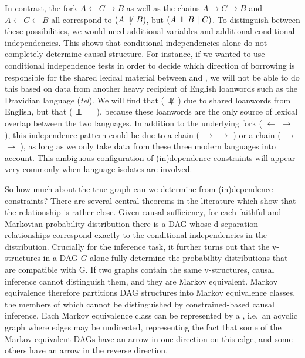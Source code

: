 In contrast, the fork $A \leftarrow C \rightarrow B$ as well as the chains $A \rightarrow C \rightarrow B$ and $A \leftarrow C \leftarrow B$ all correspond to  $(A \notindep B)$, but $(A \independent B\ |\ C)$. To distinguish between these possibilities, we would need additional variables and additional conditional independencies. This shows that conditional independencies alone do not completely determine causal structure. For instance, if we wanted to use conditional independence tests in order to decide which direction of borrowing is responsible for the shared lexical material between  and , we will not be able to do this based on data from another heavy recipient of English loanwords such as the Dravidian language  (\textit{tel}). We will find that ( $\notindep$ ) due to shared loanwords from English, but that ( $\independent$ \ |\ ), because these loanwords are the only source of lexical overlap between the two languages. In addition to the underlying fork ( $\leftarrow$  $\rightarrow$ ), this independence pattern could be due to a chain ( $\rightarrow$  $\rightarrow$ ) or a chain ( $\rightarrow$  $\rightarrow$ ), as long as we only take data from these three modern languages into account. This ambiguous configuration of (in)dependence constraints will appear very commonly when language isolates are involved.

So how much about the true graph can we determine from (in)dependence constraints? There are several central theorems in the literature which show that the relationship is rather close. Given causal sufficiency, for each faithful and Markovian probability distribution there is a DAG whose d-separation relationships correspond exactly to the conditional independencies in the distribution. Crucially for the inference task, it further turns out that the v-structures in a DAG $G$ alone fully determine the probability distributions that are compatible with G. If two graphs contain the same v-structures, causal inference cannot distinguish them, and they are Markov equivalent. Markov equivalence therefore partitions DAG structures into Markov equivalence classes, the members of which cannot be distinguished by constrained-based causal inference. Each Markov equivalence class can be represented by a \textit{}, i.e.\ an acyclic graph where edges may be undirected, representing the fact that some of the Markov equivalent DAGs have an arrow in one direction on this edge, and some others have an arrow in the reverse direction.

